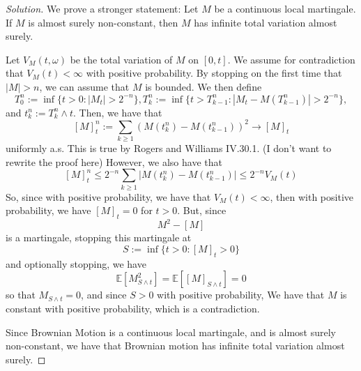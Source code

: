 \documentclass{amsart}
\begin{document}
\begin{proof}[Solution]
    We prove a stronger statement: 
    Let $M$ be a continuous local martingale. 
    If $M$ is almost surely non-constant, then $M$ has infinite total variation almost surely.

    Let $V_M(t, \omega)$ be the total variation of $M$ on $[0,t]$.
    We assume for contradiction that $V_M(t) < \infty$ with positive probability.
    By stopping on the first time that $|M| > n$, we can assume that $M$ is bounded. 
    We then define
    \[
    T_0^n := \inf \{t > 0 : |M_t| > 2^{-n}\}, T_k^n := \inf \{t > T_{k-1}^n : |M_t - M(T_{k-1}^n)| > 2^{-n}\}, 
    \]
    and $t_k^n := T_k^n \wedge t$. 
    Then, we have that 
    \[
    [M]_t^n := \sum_{k \ge 1}(M(t_k^n) - M(t_{k-1}^n))^2 \to [M]_t 
    \]
    uniformly a.s. This is true by Rogers and Williams IV.30.1. (I don't want to rewrite the proof here)
    However, we also have that 
    \[
    [M]_t^n \le 2^{-n} \sum_{k \ge 1}|M(t_k^n) - M(t_{k - 1}^n)| \le 2^{-n} V_M(t)
    \]
    So, since with positive probability, we have that $V_M(t) < \infty$, then with positive probability, we have $[M]_t = 0$ for $t > 0$.
    But, since 
    \[
    M^2 - [M]
    \]
    is a martingale, stopping this martingale at 
    \[
    S:= \inf\{t > 0 : [M]_t > 0\}
    \] 
    and optionally stopping, we have 
    \[
    \mathbb{E}[M^2_{S \land t}] = \mathbb{E}[[M]_{S \land t}] = 0
    \]
    so that $M_{S \land t} = 0$, and since $S > 0$ with positive probability,
    We have that $M$ is constant with positive probability, which is a contradiction.
    
    Since Brownian Motion is a continuous local martingale, and is almost surely non-constant, we have that Brownian motion has infinite total variation almost surely.
\end{proof}
\end{document}
